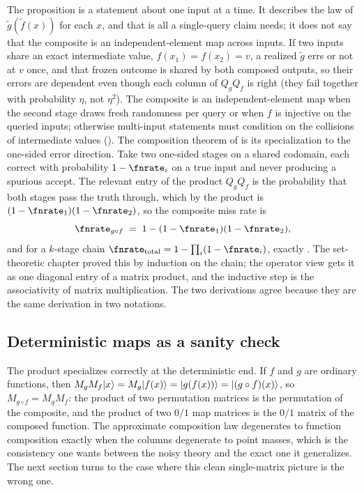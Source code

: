 The proposition is a statement about one input at a time. It describes the
law of $\tilde g(\tilde f(x))$ for each $x$, and that is all a single-query
claim needs; it does not say that the composite is an independent-element
map across inputs. If two inputs share an exact intermediate value,
$f(x_1) = f(x_2) = v$, a realized $\tilde g$ errs or not at $v$ once, and
that frozen outcome is shared by both composed outputs, so their errors
are dependent even though each column of $Q_g Q_f$ is right (they fail
together with probability $\eta$, not $\eta^2$). The composite is an
independent-element map when the second stage draws fresh randomness per
query or when $f$ is injective on the queried inputs; otherwise
multi-input statements must condition on the collisions of intermediate
values (). The composition theorem of  is its
specialization to the one-sided error direction. Take two one-sided stages on a
shared codomain, each correct with probability $1 - \fnrate_i$ on a true input
and never producing a spurious accept. The relevant entry of the product
$Q_g Q_f$ is the probability that both stages pass the truth through, which by
the product is $(1 - \fnrate_1)(1 - \fnrate_2)$, so the composite miss rate is
\[
  \fnrate_{g \circ f} \;=\; 1 - (1 - \fnrate_1)(1 - \fnrate_2),
\]
and for a $k$-stage chain $\fnrate_{\mathrm{total}} = 1 - \prod_i (1 -
\fnrate_i)$, exactly . The set-theoretic
chapter proved this by induction on the chain; the operator view gets it as one
diagonal entry of a matrix product, and the inductive step is the associativity
of matrix multiplication. The two derivations agree because they are the same
derivation in two notations.

\subsection*{Deterministic maps as a sanity check}

The product specializes correctly at the deterministic end. If $f$ and $g$ are
ordinary functions, then $M_g M_f \lvert x \rangle = M_g \lvert f(x) \rangle = \lvert g(f(x)) \rangle =
\lvert (g \circ f)(x) \rangle$, so $M_{g \circ f} = M_g M_f$: the product of two
permutation matrices is the permutation of the composite, and the product of two
$0/1$ map matrices is the $0/1$ matrix of the composed function. The
approximate composition law degenerates to function composition exactly when the
columns degenerate to point masses, which is the consistency one wants between
the noisy theory and the exact one it generalizes. The next section turns to the
case where this clean single-matrix picture is the wrong one.
